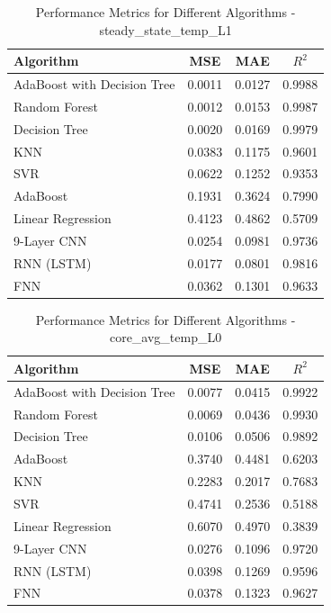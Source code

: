 \documentclass[conference]{IEEEtran}
\begin{document}
\begin{table}[htbp]
	\caption{Performance Metrics for Different Algorithms - steady\_state\_temp\_L1}
	\label{tab:steady_state_temp_L1}
	\begin{tabular}{lccc}
		\toprule
		\textbf{Algorithm} & \textbf{MSE} & \textbf{MAE} & \textbf{\(R^2\)} \\
		\midrule
		AdaBoost with Decision Tree & 0.0011 & 0.0127 & 0.9988 \\
		Random Forest & 0.0012 & 0.0153 & 0.9987 \\
		Decision Tree & 0.0020 & 0.0169 & 0.9979 \\
		KNN & 0.0383 & 0.1175 & 0.9601 \\
		SVR & 0.0622 & 0.1252 & 0.9353 \\
		AdaBoost & 0.1931 & 0.3624 & 0.7990 \\
		Linear Regression & 0.4123 & 0.4862 & 0.5709 \\
		9-Layer CNN                & 0.0254       & 0.0981       & 0.9736      \\ 
		RNN (LSTM)  & 0.0177       & 0.0801       & 0.9816      \\ 
		FNN                & 0.0362       & 0.1301       & 0.9633      \\ 
		\bottomrule
	\end{tabular}
\end{table}


\begin{table}[htbp]
	\caption{Performance Metrics for Different Algorithms - core\_avg\_temp\_L0}
	\label{tab:core_avg_temp_L0}
	\begin{tabular}{lccc}
		\toprule
		\textbf{Algorithm} & \textbf{MSE} & \textbf{MAE} & \textbf{\(R^2\)} \\
		\midrule
		AdaBoost with Decision Tree & 0.0077 & 0.0415 & 0.9922 \\
		Random Forest & 0.0069 & 0.0436 & 0.9930 \\
		Decision Tree & 0.0106 & 0.0506 & 0.9892 \\
		AdaBoost & 0.3740 & 0.4481 & 0.6203 \\
		KNN & 0.2283 & 0.2017 & 0.7683 \\
		SVR & 0.4741 & 0.2536 & 0.5188 \\
		Linear Regression & 0.6070 & 0.4970 & 0.3839 \\
		9-Layer CNN                & 0.0276       & 0.1096       & 0.9720      \\ 
		RNN (LSTM)  & 0.0398       & 0.1269       & 0.9596      \\ 
		FNN                & 0.0378       & 0.1323       & 0.9627      \\ 
		\bottomrule
	\end{tabular}
\end{table}
\end{document}
